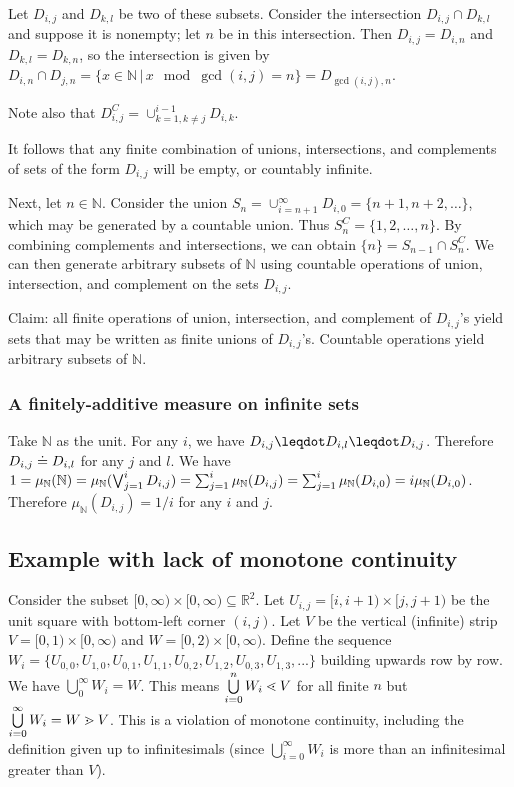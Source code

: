 \documentclass[10pt, onecolumn, longbibliography, nofootinbib]{revtex4-2}
\begin{document}
Let $D_{i,j}$ and $D_{k,l}$ be two of these subsets. Consider the intersection $D_{i,j}\cap D_{k,l}$ and suppose it is nonempty; let $n$ be in this intersection. Then $D_{i,j} = D_{i,n}$ and $D_{k,l} = D_{k,n}$, so the intersection is given by $D_{i,n}\cap D_{j,n} = \{x\in \mathbb{N} \, | \, x \mod \gcd(i,j) = n\} = D_{\gcd(i,j),n}$. 

Note also that $D_{i,j}^C = \cup_{k=1,k\neq j}^{i-1}D_{i,k}$. 

It follows that any finite combination of unions, intersections, and complements of sets of the form $D_{i,j}$ will be empty, or countably infinite. 

Next, let $n\in\mathbb{N}$. Consider the union $S_n = \cup_{i=n+1}^{\infty}D_{i,0} = \{n+1,n+2,\ldots\}$, which may be generated by a countable union. Thus $S_n^C = \{1,2,\ldots,n\}$. By combining complements and intersections, we can obtain $\{n\} = S_{n-1}\cap S_n^C$. We can then generate arbitrary subsets of $\mathbb{N}$ using countable operations of union, intersection, and complement on the sets $D_{i,j}$. 

Claim: all finite operations of union, intersection, and complement of $D_{i,j}$'s yield sets that may be written as finite unions of $D_{i,j}$'s. Countable operations yield arbitrary subsets of $\mathbb{N}$. 

\subsubsection{A finitely-additive measure on infinite sets}

Take $\mathbb{N}$ as the unit. For any $i$, we have $D_{i,j} \finer D_{i,l} \finer D_{i,j}$. Therefore $D_{i,j} \doteq D_{i,l}$ for any $j$ and $l$. We have $1 = \mu_{\mathbb{N}}(\mathbb{N}) = \mu_{\mathbb{N}}(\bigvee_{j=1}^i D_{i,j}) = \sum_{j=1}^i \mu_{\mathbb{N}}( D_{i,j}) = \sum_{j=1}^i \mu_{\mathbb{N}}( D_{i,0}) = i \mu_{\mathbb{N}}( D_{i,0}) $. Therefore $\mu_{\mathbb{N}}( D_{i,j}) = 1/i$ for any $i$ and $j$.


\subsection{Example with lack of monotone continuity}\label{lack_of_monotone_continuity}

Consider the subset $[0,\infty)\times[0,\infty)\subseteq\mathbb{R}^2$. Let $U_{i,j} = [i, i+1)\times[j,j+1)$ be the unit square with bottom-left corner $(i,j)$. Let $V$ be the vertical (infinite) strip $V = [0,1)\times[0,\infty)$ and $W = [0,2)\times[0,\infty)$. Define the sequence $W_i = \{ U_{0,0}, U_{1,0}, U_{0,1}, U_{1,1}, U_{0,2}, U_{1,2}, U_{0,3}, U_{1,3}, ... \}$ building upwards row by row. We have $\bigcup\limits_0^\infty W_i = W$. This means $\bigcup\limits_{i=0}^n W_i\lessdot V$ for all finite $n$ but $\bigcup\limits_{i=0}^\infty W_i = W \gtrdot V$. This is a violation of monotone continuity, including the definition given up to infinitesimals (since $\bigcup\limits_{i=0}^{\infty}W_i$ is more than an infinitesimal greater than $V$). 
\end{document}
